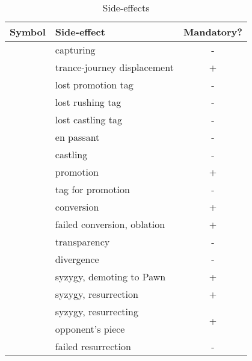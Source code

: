 \begin{table}[!h]
\centering
\begin{tabular}{ rlc }
\toprule %
\textbf{Symbol}             & \textbf{Side-effect}          & \textbf{Mandatory?}   \\
\midrule %
\alg{*}                     & capturing                     & -                     \\
\alg{<}                     & trance-journey displacement   & +                     \\
\cmidrule{1-3} %
\alg{==}                    & lost promotion tag            & -                     \\
\alg{::}                    & lost rushing tag              & -                     \\
\alg{\&\&}                  & lost castling tag             & -                     \\
\cmidrule{1-3} %
\alg{:}                     & en passant                    & -                     \\
\alg{\&}                    & castling                      & -                     \\
\alg{=}                     & promotion                     & +                     \\
\alg{=}                     & tag for promotion             & -                     \\
\alg{\%}                    & conversion                    & +                     \\
\alg{\%\%}                  & failed conversion, oblation   & +                     \\
\alg{\^{}}                  & transparency                  & -                     \\
\alg{/}                     & divergence                    & -                     \\
\alg{>}                     & syzygy, demoting to Pawn      & +                     \\
\alg{\$}                    & syzygy, resurrection          & +                     \\
\cmidrule{1-3} %
\multirow{2}{*}{\alg{\$\$}} & syzygy, resurrecting          & \multirow{2}{*}{+}    \\
                            & opponent's piece              &                       \\
\cmidrule{1-3} %
\alg{\$\$\$}                & failed resurrection           & -                     \\
\bottomrule %
\end{tabular}
\caption{Side-effects}
\label{tbl:Appendix/Summary/Side-effects}
\end{table}

